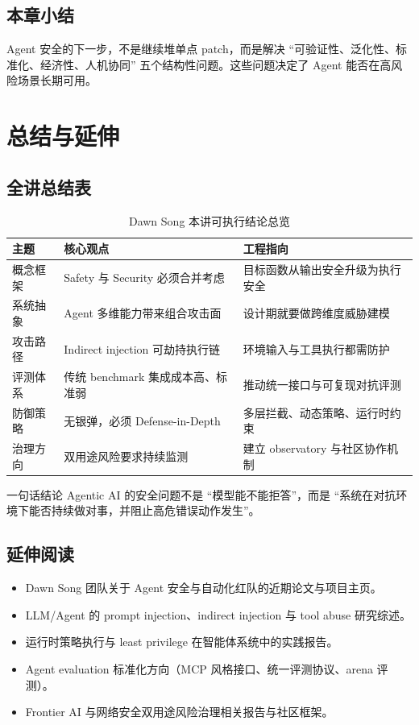 \documentclass[a4paper]{article}
\begin{document}
\subsection{本章小结}
Agent 安全的下一步，不是继续堆单点 patch，而是解决 ``可验证性、泛化性、标准化、经济性、人机协同'' 五个结构性问题。这些问题决定了 Agent 能否在高风险场景长期可用。

\section{总结与延伸}

\subsection{全讲总结表}
\begin{table}[H]
\centering
\begin{tabular}{p{2.8cm}p{3.8cm}p{4.2cm}}
\toprule
\textbf{主题} & \textbf{核心观点} & \textbf{工程指向} \\
\midrule
概念框架 & Safety 与 Security 必须合并考虑 & 目标函数从输出安全升级为执行安全 \\
系统抽象 & Agent 多维能力带来组合攻击面 & 设计期就要做跨维度威胁建模 \\
攻击路径 & Indirect injection 可劫持执行链 & 环境输入与工具执行都需防护 \\
评测体系 & 传统 benchmark 集成成本高、标准弱 & 推动统一接口与可复现对抗评测 \\
防御策略 & 无银弹，必须 Defense-in-Depth & 多层拦截、动态策略、运行时约束 \\
治理方向 & 双用途风险要求持续监测 & 建立 observatory 与社区协作机制 \\
\bottomrule
\end{tabular}
\caption{Dawn Song 本讲可执行结论总览}
\end{table}

\begin{importantbox}{一句话结论}
Agentic AI 的安全问题不是 ``模型能不能拒答''，而是 ``系统在对抗环境下能否持续做对事，并阻止高危错误动作发生''。
\end{importantbox}

\subsection{延伸阅读}
\begin{itemize}
    \item Dawn Song 团队关于 Agent 安全与自动化红队的近期论文与项目主页。
    \item LLM/Agent 的 prompt injection、indirect injection 与 tool abuse 研究综述。
    \item 运行时策略执行与 least privilege 在智能体系统中的实践报告。
    \item Agent evaluation 标准化方向（MCP 风格接口、统一评测协议、arena 评测）。
    \item Frontier AI 与网络安全双用途风险治理相关报告与社区框架。
\end{itemize}
\end{document}
